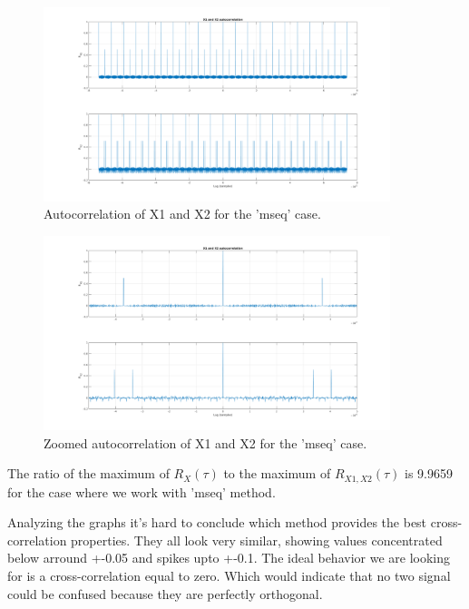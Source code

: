 \begin{figure}[H]
	\centering
	\includegraphics[width=0.9\textwidth]{figs/ex8_autocorr_mseq.png}
	\caption{Autocorrelation of X1 and X2 for the 'mseq' case.}
	\label{fig:ex8_autocorr_pi}
\end{figure}

\begin{figure}[H]
	\centering
	\includegraphics[width=0.9\textwidth]{figs/ex8_autocorr_zoomed_mseq.png}
	\caption{Zoomed autocorrelation of X1 and X2 for the 'mseq' case.}
	\label{fig:ex8_autocorr_zoomed_mseq}
\end{figure}

The ratio of the maximum of $R_X(\tau)$ to the maximum of $R_{X1,X2}(\tau)$ is
9.9659 for the case where we work with 'mseq' method.

Analyzing the graphs it's hard to conclude which method provides the best
cross-correlation properties. They all look very similar, showing values
concentrated below arround +-0.05 and spikes upto +-0.1. The ideal behavior we
are looking for is a cross-correlation equal to zero. Which would indicate that
no two signal could be confused because they are perfectly orthogonal.

